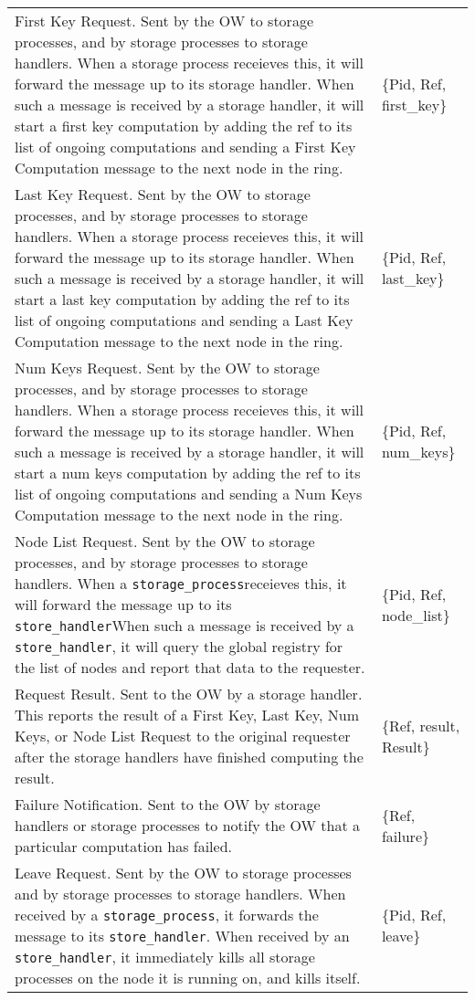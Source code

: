 \documentclass[12pt,letterpaper]{article}
\renewcommand{\tt}[1]{\texttt{#1}}
\newcommand{\sh}{\tt{store\_handler}}
\renewcommand{\sp}{\tt{storage\_process}}
\begin{document}
\begin{longtable}{p{4.5in}T}
First Key Request. Sent by the OW to storage processes, and by storage processes to storage handlers. When a storage process receieves this, it will forward the message up to its storage handler. When such a message is received by a storage handler, it will start a first key computation by adding the ref to its list of ongoing computations and sending a First Key Computation message to the next node in the ring. &
\{Pid, Ref, first\_key\} \\

Last Key Request. Sent by the OW to storage processes, and by storage processes to storage handlers. When a storage process receieves this, it will forward the message up to its storage handler. When such a message is received by a storage handler, it will start a last key computation by adding the ref to its list of ongoing computations and sending a Last Key Computation message to the next node in the ring. &
\{Pid, Ref, last\_key\} \\

Num Keys Request. Sent by the OW to storage processes, and by storage processes to storage handlers. When a storage process receieves this, it will forward the message up to its storage handler. When such a message is received by a storage handler, it will start a num keys computation by adding the ref to its list of ongoing computations and sending a Num Keys Computation message to the next node in the ring. &
\{Pid, Ref, num\_keys\} \\

Node List Request. Sent by the OW to storage processes, and by storage processes to storage handlers. When a \sp receieves this, it will forward the message up to its \sh When such a message is received by a \sh, it will query the global registry for the list of nodes and report that data to the requester. &
\{Pid, Ref, node\_list\} \\

Request Result. Sent to the OW by a storage handler. This reports the result of a First Key, Last Key, Num Keys, or Node List Request to the original requester after the storage handlers have finished computing the result. &
\{Ref, result, Result\} \\

Failure Notification. Sent to the OW by storage handlers or storage processes to notify the OW that a particular computation has failed. &
\{Ref, failure\} \\

Leave Request. Sent by the OW to storage processes and by storage processes to storage handlers. When received by a \sp, it forwards the message to its \sh. When received by an \sh, it immediately kills all storage processes on the node it is running on, and kills itself. &
\{Pid, Ref, leave\} \\


\end{longtable}
\end{document}
